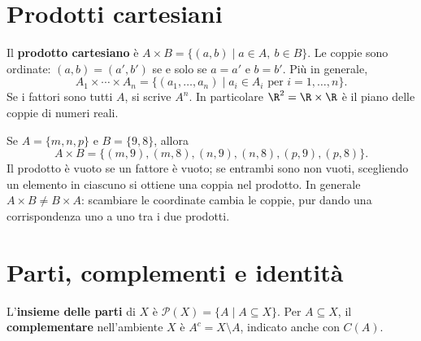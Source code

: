 \begin{schema}
\end{schema}

\section{Prodotti cartesiani}
\begin{definizione}
Il \textbf{prodotto cartesiano} è $A\times B=\{(a,b)\mid a\in A,\ b\in B\}$. Le coppie sono ordinate: $(a,b)=(a',b')$ se e solo se $a=a'$ e $b=b'$. Più in generale,
\[
A_1\times\cdots\times A_n=\{(a_1,\ldots,a_n)\mid a_i\in A_i\text{ per }i=1,\ldots,n\}.
\]
Se i fattori sono tutti $A$, si scrive $A^n$. In particolare $\R^2=\R\times\R$ è il piano delle coppie di numeri reali.
\end{definizione}

\begin{esempio}
Se $A=\{m,n,p\}$ e $B=\{9,8\}$, allora
\[
A\times B=\{(m,9),(m,8),(n,9),(n,8),(p,9),(p,8)\}.
\]
Il prodotto è vuoto se un fattore è vuoto; se entrambi sono non vuoti, scegliendo un elemento in ciascuno si ottiene una coppia nel prodotto. In generale $A\times B\ne B\times A$: scambiare le coordinate cambia le coppie, pur dando una corrispondenza uno a uno tra i due prodotti.
\end{esempio}

\section{Parti, complementi e identità}
\begin{definizione}
L'\textbf{insieme delle parti} di $X$ è $\mathcal P(X)=\{A\mid A\subseteq X\}$. Per $A\subseteq X$, il \textbf{complementare} nell'ambiente $X$ è $A^c=X\setminus A$, indicato anche con $C(A)$.
\end{definizione}

